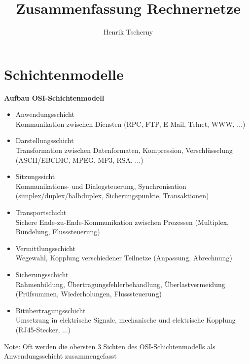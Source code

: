 \documentclass[12pt,a4paper]{article}
\title{Zusammenfassung Rechnernetze}
\author{Henrik Tscherny}
\begin{document}
\maketitle
\tableofcontents
\section{Schichtenmodelle}
\textbf{Aufbau OSI-Schichtenmodell}\\
\begin{itemize}
\item Anwendungsschicht\\
Kommunikation zwischen Diensten (RPC, FTP, E-Mail, Telnet, WWW, ...)
\item Darstellungsschicht\\
Transformation zwischen Datenformaten, Kompression, Verschlüsselung (ASCII/EBCDIC, MPEG, MP3, RSA, ...)
\item Sitzungssicht\\
Kommunikations- und Dialogsteuerung, Synchronisation (simplex/duplex/halbduplex, Sicherungspunkte, Transaktionen)
\item Transportschicht\\
Sichere Ende-zu-Ende-Kommunikation zwischen Prozessen (Multiplex, Bündelung, Flusssteuerung)
\item Vermittlungsschicht\\
Wegewahl, Kopplung verschiedener Teilnetze (Anpassung, Abrechnung)
\item Sicherungsschicht\\
Rahmenbildung, Übertragungsfehlerbehandlung, Überlastvermeidung (Prüfsummen, Wiederholungen, Flusssteuerung)
\item Bitübertragungsschicht\\
Umsetzung in elektrische Signale, mechanische und elektrische Kopplung (RJ45-Stecker, ...)
\end{itemize}
Note: Oft werden die obersten 3 Sichten des OSI-Schichtenmodells als Anwendungsschicht zusammengefasst
\end{document}
